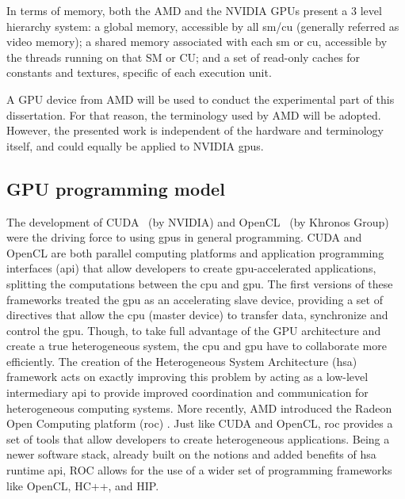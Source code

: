 In terms of memory, both the AMD and the NVIDIA GPUs present a 3 level hierarchy system: a global memory, accessible by all \acrshort{sm}/\acrshort{cu} (generally referred as video memory); a shared memory associated with each \acrshort{sm} or \acrshort{cu}, accessible by the threads running on that SM or CU; and a set of read-only caches for constants and textures, specific of each execution unit.

A GPU device from AMD will be used to conduct the experimental part of this dissertation. For that reason, the terminology used by AMD will be adopted. However, the presented work is independent of the hardware and terminology itself, and could equally be applied to NVIDIA \acrshort{gpu}s.

\subsection{GPU programming model}
The development of CUDA~\cite{nvidia_cuda_2017} (by NVIDIA) and OpenCL~\cite{noauthor_opencl_2013} (by Khronos Group) were the driving force to using \acrshort{gpu}s in general programming. CUDA and OpenCL are both parallel computing platforms and application programming interfaces (\acrshort{api}) that allow developers to create \acrshort{gpu}-accelerated applications, splitting the computations between the \acrshort{cpu} and \acrshort{gpu}. The first versions of these frameworks treated the \acrshort{gpu} as an accelerating slave device, providing a set of directives that allow the \acrshort{cpu} (master device) to transfer data, synchronize and control the \acrshort{gpu}.  Though, to take full advantage of the GPU architecture and create a true heterogeneous system, the \acrshort{cpu} and \acrshort{gpu} have to collaborate more efficiently. The creation of the Heterogeneous System Architecture (\acrshort{hsa}) \cite{hwu_heterogeneous_2015} framework acts on exactly improving this problem by acting as a low-level intermediary \acrshort{api} to provide improved coordination and communication for heterogeneous computing systems.  More recently, AMD introduced the Radeon Open Computing platform (\acrshort{roc}) \cite{noauthor_radeonopencompute/rocm_2019}. Just like CUDA and OpenCL, \acrshort{roc} provides a set of tools that allow developers to create heterogeneous applications. Being a newer software stack, already built on the notions and added benefits of \acrshort{hsa} runtime \acrshort{api}, ROC allows for the use of a wider set of programming frameworks like OpenCL, HC++, and HIP.



